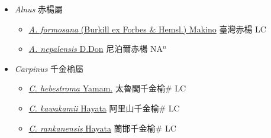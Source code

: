 
  \begin{itemize}
 \item[] \textit{Alnus} 赤楊屬
                    
  \begin{itemize}
        \item[] \href{http://www.theplantlist.org/tpl1.1/search?q=Alnus+formosana}{\textit{A. formosana} (Burkill ex Forbes \& Hemsl.) Makino}   臺灣赤楊 LC
        \item[] \href{http://www.theplantlist.org/tpl1.1/search?q=Alnus+nepalensis}{\textit{A. nepalensis} D.Don}   尼泊爾赤楊 NA$^n$
  \end{itemize}
 \item[] \textit{Carpinus} 千金榆屬
                    
  \begin{itemize}
        \item[] \href{http://www.theplantlist.org/tpl1.1/search?q=Carpinus+hebestroma}{\textit{C. hebestroma} Yamam.}   太魯閣千金榆\# LC
        \item[] \href{http://www.theplantlist.org/tpl1.1/search?q=Carpinus+kawakamii}{\textit{C. kawakamii} Hayata}   阿里山千金榆\# LC
        \item[] \href{http://www.theplantlist.org/tpl1.1/search?q=Carpinus+rankanensis}{\textit{C. rankanensis} Hayata}   蘭邯千金榆\# LC
  \end{itemize}
  \end{itemize}

